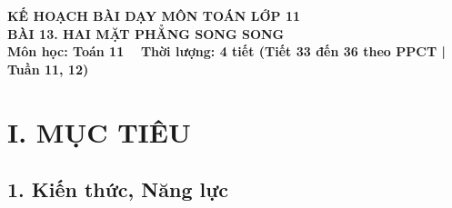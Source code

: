 \documentclass[12pt, a4paper]{article}
\begin{document}
\begin{center}
    {\fontsize{14pt}{17pt}\selectfont \textbf{KẾ HOẠCH BÀI DẠY MÔN TOÁN LỚP 11}}\\[6pt]
    {\fontsize{16pt}{19pt}\selectfont \textbf{BÀI 13. HAI MẶT PHẲNG SONG SONG}}\\[4pt]
    {\fontsize{12pt}{15pt}\selectfont \textbf{Môn học: Toán 11} \ \textbar \ \textbf{Thời lượng: 4 tiết (Tiết 33 đến 36 theo PPCT | Tuần 11, 12)}}
\end{center}

\vspace{5pt}

\section*{I. MỤC TIÊU}

\subsection*{1. Kiến thức, Năng lực}
\end{document}
